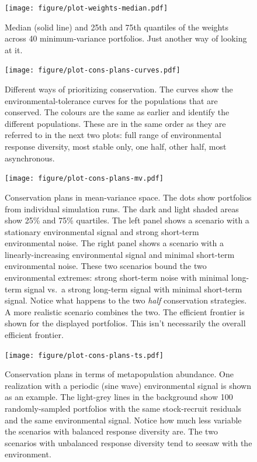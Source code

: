 \documentclass[12pt]{article}
\begin{document}
\begin{figure}[htbp]
\centering
\texttt{[image: figure/plot-weights-median.pdf]}
\caption{Median (solid line) and 25th and 75th quantiles of the weights
across 40 minimum-variance portfolios. Just another way of looking at
it.}
\end{figure}

\begin{figure}[htbp]
\centering
\texttt{[image: figure/plot-cons-plans-curves.pdf]}
\caption{Different ways of prioritizing conservation. The curves show
the environmental-tolerance curves for the populations that are
conserved. The colours are the same as earlier and identify the
different populations. These are in the same order as they are referred
to in the next two plots: full range of environmental response
diversity, most stable only, one half, other half, most asynchronous.}
\end{figure}

\begin{figure}[htbp]
\centering
\texttt{[image: figure/plot-cons-plans-mv.pdf]}
\caption{Conservation plans in mean-variance space. The dots show
portfolios from individual simulation runs. The dark and light shaded
areas show 25\% and 75\% quartiles. The left panel shows a scenario with
a stationary environmental signal and strong short-term environmental
noise. The right panel shows a scenario with a linearly-increasing
environmental signal and minimal short-term environmental noise. These
two scenarios bound the two environmental extremes: strong short-term
noise with minimal long-term signal vs.~a strong long-term signal with
minimal short-term signal. Notice what happens to the two \emph{half}
conservation strategies. A more realistic scenario combines the two. The
efficient frontier is shown for the displayed portfolios. This isn't
necessarily the overall efficient frontier.}
\end{figure}

\begin{figure}[htbp]
\centering
\texttt{[image: figure/plot-cons-plans-ts.pdf]}
\caption{Conservation plans in terms of metapopulation abundance. One
realization with a periodic (sine wave) environmental signal is shown as
an example. The light-grey lines in the background show 100
randomly-sampled portfolios with the same stock-recruit residuals and
the same environmental signal. Notice how much less variable the
scenarios with balanced response diversity are. The two scenarios with
unbalanced response diversity tend to seesaw with the environment.}
\end{figure}
\end{document}
